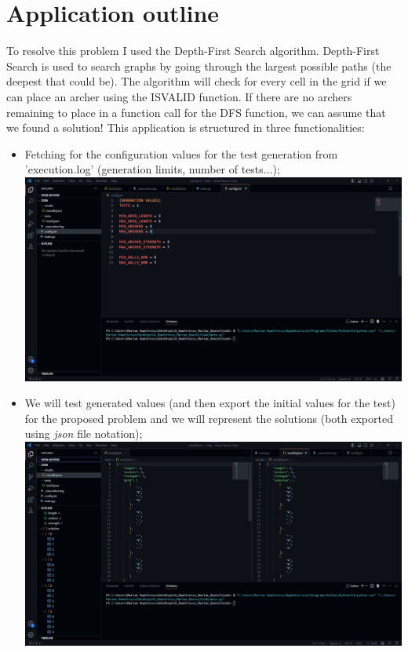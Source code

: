 \documentclass[12pt]{article}
\begin{document}
\section{Application outline}
To resolve this problem I used the Depth-First Search algorithm. Depth-First Search is used to search graphs by going through the largest possible paths (the deepest that could be). The algorithm will check for every cell in the grid if we can place an archer using the IS\textunderscore VALID function. If there are no archers remaining to place in a function call for the DFS function, we can assume that we found a solution!
This application is structured in three functionalities:
\begin{itemize}
    \item Fetching for the configuration values for the test generation from '\textunderscore execution.log' (generation limits, number of tests...);\newline
    \includegraphics[width=\textwidth]{configuration.jpg}
    \vfill
    \item We will test generated values (and then export the initial values for the test) for the proposed problem and we will represent the solutions (both exported using \textit{json} file notation);\newline
    \includegraphics[width=\textwidth]{values_export.jpg}

\end{itemize}
\end{document}
